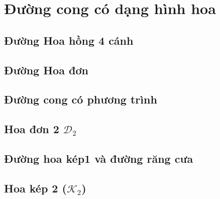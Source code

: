 \chapter{Đường cong có dạng hình hoa}
\section{Đường Hoa hồng 4 cánh}
\section{Đường Hoa đơn}
\section{Đường cong có phương trình}
\section{Hoa đơn 2 $\mathcal D_2$}
\section{Đường hoa kép1 và đường răng cưa}
\section{Hoa kép 2 ($\mathcal K_2$)}